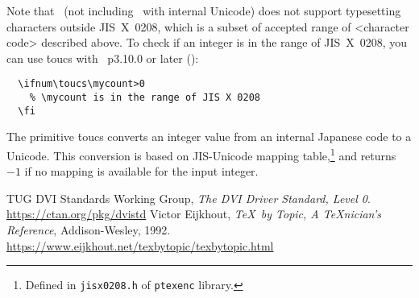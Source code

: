 \documentclass[a4paper,11pt,dvipdfmx]{article}
\def\code#1{\texttt{#1}}
\begin{document}
Note that \pTeX\ (not including \upTeX\ with internal Unicode) does not
support typesetting characters outside JIS~X~0208,
which is a subset of accepted range of <character code> described above.
To check if an integer is in the range of JIS~X~0208,
you can use \.{toucs} with \pTeX~p3.10.0 or later ():
\begin{verbatim}
  \ifnum\toucs\mycount>0
    % \mycount is in the range of JIS X 0208
  \fi
\end{verbatim}
The primitive \.{toucs} converts an integer value
from an internal Japanese code to a Unicode.
This conversion is based on JIS-Unicode mapping table,\footnote{Defined in
\code{jisx0208.h} of \code{ptexenc} library.} and returns $-1$
if no mapping is available for the input integer.


\newpage

\begin{thebibliography}{99}
  TUG DVI Standards Working Group,
  \textit{The DVI Driver Standard, Level 0}.\\
  \url{https://ctan.org/pkg/dvistd}
  Victor Eijkhout, \textit{\TeX\ by Topic, A \TeX nician's Reference},
  Addison-Wesley, 1992.\\
  \url{https://www.eijkhout.net/texbytopic/texbytopic.html}
\end{thebibliography}

\newpage
\printindex
\end{document}
